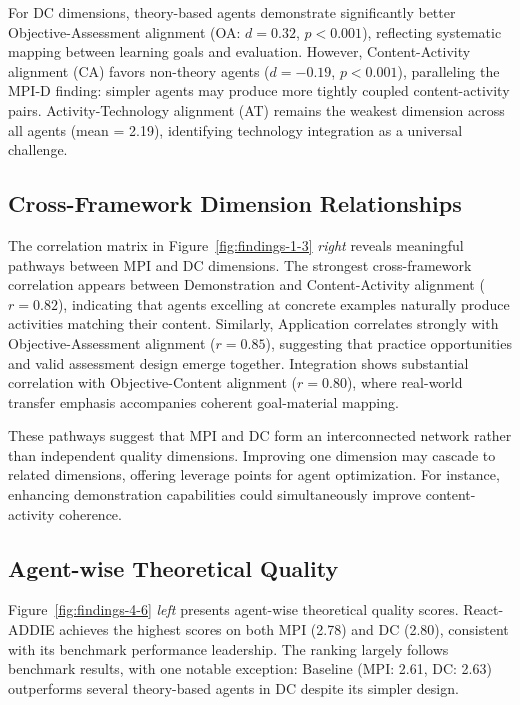 For DC dimensions, theory-based agents demonstrate significantly better Objective-Assessment alignment (OA: $d = 0.32$, $p < 0.001$), reflecting systematic mapping between learning goals and evaluation. However, Content-Activity alignment (CA) favors non-theory agents ($d = -0.19$, $p < 0.001$), paralleling the MPI-D finding: simpler agents may produce more tightly coupled content-activity pairs. Activity-Technology alignment (AT) remains the weakest dimension across all agents (mean = 2.19), identifying technology integration as a universal challenge.

\subsection{Cross-Framework Dimension Relationships}

The correlation matrix in Figure~\ref{fig:findings-1-3} \textit{right} reveals meaningful pathways between MPI and DC dimensions. The strongest cross-framework correlation appears between Demonstration and Content-Activity alignment ($r = 0.82$), indicating that agents excelling at concrete examples naturally produce activities matching their content. Similarly, Application correlates strongly with Objective-Assessment alignment ($r = 0.85$), suggesting that practice opportunities and valid assessment design emerge together. Integration shows substantial correlation with Objective-Content alignment ($r = 0.80$), where real-world transfer emphasis accompanies coherent goal-material mapping.

These pathways suggest that MPI and DC form an interconnected network rather than independent quality dimensions. Improving one dimension may cascade to related dimensions, offering leverage points for agent optimization. For instance, enhancing demonstration capabilities could simultaneously improve content-activity coherence.

\subsection{Agent-wise Theoretical Quality}

Figure~\ref{fig:findings-4-6} \textit{left} presents agent-wise theoretical quality scores. React-ADDIE achieves the highest scores on both MPI (2.78) and DC (2.80), consistent with its benchmark performance leadership. The ranking largely follows benchmark results, with one notable exception: Baseline (MPI: 2.61, DC: 2.63) outperforms several theory-based agents in DC despite its simpler design.

